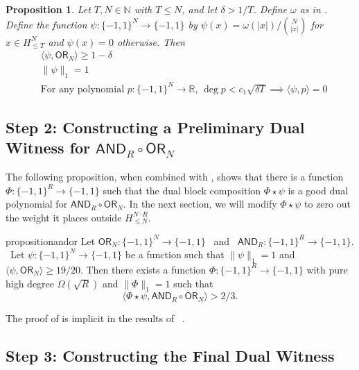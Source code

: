 \documentclass[11pt, letterpaper, fleqn]{article}
\newtheorem{proposition}[theorem]{Proposition}
\theoremstyle{plain}
\newcommand{\R}{\mathbb{R}}
\newcommand{\OR}{\mathsf{ OR}}
\newcommand{\bits}{\{-1,1\}}
\newcommand{\ls}{\star}
\newcommand{\N}{\mathbb{N}}
\newcommand{\AND}{\mathsf{AND}}
\begin{document}
\begin{proposition} \label{prop:or-dual}
Let $T, N \in \N$ with $T \le N$, and let $\delta > 1/T$. Define $\omega$ as in . Define the function $\psi: \bits^N \to \bits$ by $\psi(x) = \omega(|x|) / \binom{N}{ |x|}$ for $x \in H^N_{\le T}$ and $\psi(x) = 0$ otherwise. Then
\begin{align} &\langle \psi, \OR_N \rangle \ge 1-\delta  \label{eqn:or-corr} \\
& \|\psi\|_1 = 1   \label{eqn:or-norm}\\
& \text{For any polynomial } p \colon \bits^N \to \R\text{, } \deg p < c_1\sqrt{\delta T} \implies \langle \psi, p \rangle = 0 \label{eqn:or-phd}
\end{align}
\end{proposition}



\subsection{Step 2: Constructing a Preliminary Dual Witness for \texorpdfstring{$\AND_R \circ \OR_N$}{AND o OR}} \label{sec:prelim-dual}


The following proposition, when combined with , shows that there is a function $\Phi : \bits^R \to \bits$ such that the dual block composition $\Phi \ls \psi$ is a good dual polynomial for $\AND_R \circ \OR_N$. In the next section, we will modify $\Phi \ls \psi$ to zero out the weight it places outside $H_{\le N}^{N \cdot R}$.

\begin{restatable}{proposition}{andor} \label{prop:and-or}
Let $\OR_N : \bits^N \to \bits$ \ and \ $\AND_R \colon \bits^R \to \bits$. \ Let  $\psi\colon \bits^N \to \bits$ be a function such that $\|\psi\|_1 = 1$ and $\langle \psi, \OR_N \rangle \ge 19/20$. Then there exists a function $\Phi \colon \bits^R \to \bits$ with pure high degree $\Omega(\sqrt{R})$ and $\|\Phi\|_1 = 1$ such that
\[ \langle \Phi \ls \psi, \AND_R \circ \OR_N \rangle > 2/3.\]
\end{restatable}

The proof of  is implicit in the results of ~\cite{bt13, sherstovandor}.


\subsection{Step 3: Constructing the Final Dual Witness} \label{sec:final-dual}
\end{document}
